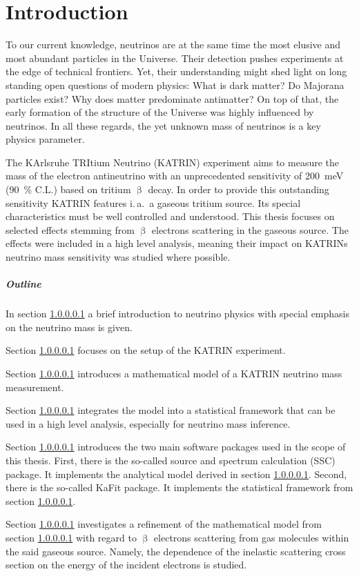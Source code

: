 \chapter{Introduction}
To our current knowledge, neutrinos are at the same time the most elusive and most abundant particles in the Universe. Their detection pushes experiments at the edge of technical frontiers. Yet, their understanding might shed light on long standing open questions of modern physics: What is dark matter? Do Majorana particles exist? Why does matter predominate antimatter? On top of that, the early formation of the structure of the Universe was highly influenced by neutrinos. In all these regards, the yet unknown mass of neutrinos is a key physics parameter.

The KArlsruhe TRItium Neutrino (KATRIN) experiment aims to measure the mass of the electron antineutrino with an unprecedented sensitivity of \SI{200}{meV} (\SI{90}{\percent} C.L.) based on tritium $\upbeta$ decay. In order to provide this outstanding sensitivity KATRIN features i.\,a.~a gaseous tritium source. Its special characteristics must be well controlled and understood. This thesis focuses on selected effects stemming from $\upbeta$ electrons scattering in the gaseous source. The effects were included in a high level analysis, meaning their impact on KATRINs neutrino mass sensitivity was studied where possible.

\paragraph{Outline}
In section \ref{} a brief introduction to neutrino physics with special emphasis on the neutrino mass is given.

Section \ref{} focuses on the setup of the KATRIN experiment.

Section \ref{} introduces a mathematical model of a KATRIN neutrino mass measurement.

Section \ref{} integrates the model into a statistical framework that can be used in a high level analysis, especially for neutrino mass inference.

Section \ref{} introduces the two main software packages used in the scope of this thesis. First, there is the so-called source and spectrum calculation (SSC) package. It implements the analytical model derived in section \ref{}. Second, there is the so-called KaFit package. It implements the statistical framework from section \ref{}.

Section \ref{} investigates a refinement of the mathematical model from section \ref{} with regard to $\upbeta$ electrons scattering from gas molecules within the said gaseous source. Namely, the dependence of the inelastic scattering cross section on the energy of the incident electrons is studied.

